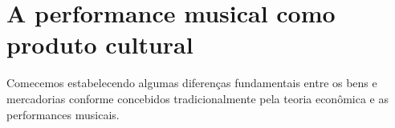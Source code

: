 \documentclass[a4paper, 12pt, openright, oneside, german, french, english, brazil]{abntex2}
\begin{document}

	
	
	
	\section{A performance musical como produto cultural}
	
	Comecemos estabelecendo algumas diferenças fundamentais entre os bens e mercadorias conforme concebidos tradicionalmente pela teoria econômica e as performances musicais.
	
\end{document}
